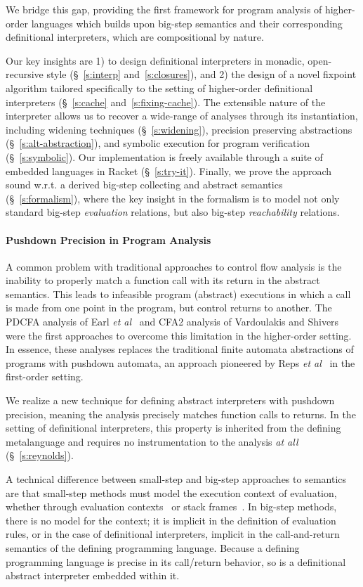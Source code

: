 We bridge this gap, providing the first framework for program analysis of
higher-order languages which builds upon big-step semantics and their
corresponding definitional interpreters, which are compositional by nature. 

Our key insights are 1) to design definitional interpreters in monadic,
open-recursive style (§~\ref{s:interp} and~\ref{s:closures}), and 2) the design
of a novel fixpoint algorithm tailored specifically to the setting of
higher-order definitional interpreters (§~\ref{s:cache}
and~\ref{s:fixing-cache}). The extensible nature of the interpreter allows us
to recover a wide-range of analyses through its instantiation, including
widening techniques (§~\ref{s:widening}), precision preserving abstractions
(§~\ref{s:alt-abstraction}), and symbolic execution for program verification
(§~\ref{s:symbolic}). Our implementation is freely available through a suite of
embedded languages in Racket (§~\ref{s:try-it}). Finally, we prove the approach
sound w.r.t. a derived big-step collecting and abstract semantics
(§~\ref{s:formalism}), where the key insight in the formalism is to model not
only standard big-step \emph{evaluation} relations, but also big-step
\emph{reachability} relations.

\paragraph{Pushdown Precision in Program Analysis}
A common problem with traditional approaches to control flow analysis is the
inability to properly match a function call with its return in the abstract
semantics. This leads to infeasible program (abstract) executions in which a
call is made from one point in the program, but control returns to another.
The PDCFA analysis of Earl \emph{et al}~\cite{dvanhorn:Earl2010Pushdown} and
CFA2 analysis of Vardoulakis and Shivers~\cite{dvanhorn:Vardoulakis2011CFA2}
were the first approaches to overcome this limitation in the higher-order
setting. In essence, these analyses replaces the traditional finite automata
abstractions of programs with pushdown automata, an approach pioneered by Reps
\emph{et al}~\cite{dvanhorn:Reps1995Precise} in the first-order setting.

We realize a new technique for defining abstract interpreters with pushdown
precision, meaning the analysis precisely matches function calls to returns. In
the setting of definitional interpreters, this property is inherited from the
defining metalanguage and requires no instrumentation to the analysis \emph{at
all} (§~\ref{s:reynolds}).

A technical difference between small-step and big-step approaches to semantics
are that small-step methods must model the execution context of evaluation,
whether through evaluation contexts~\cite{local:felleisen-TCS1992} or stack
frames~\cite{dvanhorn:Felleisen1987Calculus}. In big-step methods, there is no
model for the context; it is implicit in the definition of evaluation rules, or
in the case of definitional interpreters, implicit in the call-and-return
semantics of the defining programming language. Because a defining programming
language is precise in its call/return behavior, so is a definitional abstract
interpreter embedded within it.
